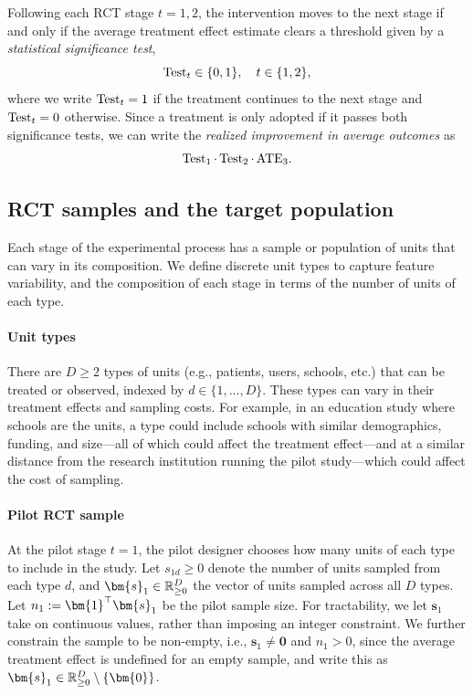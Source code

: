 Following each RCT stage $t=1,2$, the intervention moves to the next stage if and only if the average treatment effect estimate clears a threshold given by a \emph{statistical significance test},
\[
  \operatorname{Test}_t\in\{0,1\},\quad t\in\{1,2\},
\]
where we write $\operatorname{Test}_t=1$ if the treatment continues to the next stage and $\operatorname{Test}_t=0$ otherwise.
Since a treatment is only adopted if it passes both significance tests, we can write the \emph{realized improvement in average outcomes} as
\[
  \operatorname{Test}_1 \cdot \operatorname{Test}_2 \cdot\, \mathrm{ATE}_3.
\]

\subsection{RCT samples and the target population}

Each stage of the experimental process has a sample or population of units that can vary in its composition.
We define discrete unit types to capture feature variability, and the composition of each stage in terms of the number of units of each type.

\paragraph{Unit types}
There are $D\ge 2$ types of units (e.g., patients, users, schools, etc.) that can be treated or observed, indexed by $d\in\{1,\ldots,D\}$.
These types can vary in their treatment effects and sampling costs.
For example, in an education study where schools are the units, a type could include schools with similar demographics, funding, and size---all of which could affect the treatment effect---and at a similar distance from the research institution running the pilot study---which could affect the cost of sampling.

\paragraph{Pilot RCT sample}
At the pilot stage $t=1$, the pilot designer chooses how many units of each type to include in the study.
Let $s_{1d}\geq 0$ denote the number of units sampled from each type $d$, and $\bm{s}_1\in\R_{\geq 0}^D$ the vector of units sampled across all $D$ types.
Let $n_1 \defeq \bm{1}^{\top}\bm{s}_1$ be the pilot sample size.
For tractability, we let $\bm{s}_1$ take on continuous values, rather than imposing an integer constraint.
We further constrain the sample to be non-empty, i.e., $\bm{s}_1 \neq \bm{0}$ and $n_1 > 0$, since the average treatment effect is undefined for an empty sample, and write this as $\bm{s}_1 \in \R_{\geq 0}^{D} \setminus \{\bm{0}\}$.

